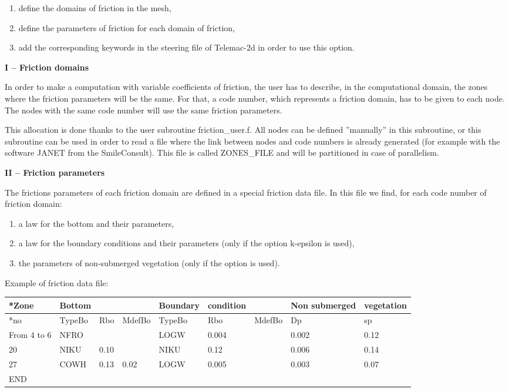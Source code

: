 \documentclass{article} %
\begin{document}
\begin{enumerate}
\item  define the domains of friction in the mesh,

\item  define the parameters of friction for each domain of friction,

\item  add the corresponding keywords in the steering file of Telemac-2d in order to use this option.
\end{enumerate}

 \textbf{I -- Friction domains}

 In order to make a computation with variable coefficients of friction, the user has to describe, in the computational domain, the zones where the friction parameters will be the same. For that, a code number, which represents a friction domain, has to be given to each node. The nodes with the same code number will use the same friction parameters.

 This allocation is done thanks to the user subroutine friction\_user.f. All nodes can be defined ''manually'' in this subroutine, or this subroutine can be used in order to read a file where the link between nodes and code numbers is already generated (for example with the software JANET from the SmileConsult). This file is called ZONES\_FILE and will be partitioned in case of parallelism.

 \textbf{II -- Friction parameters}

 The frictions parameters of each friction domain are defined in a special friction data file. In this file we find, for each code number of friction domain:

\begin{enumerate}
\item  a law for the bottom and their parameters,

\item  a law for the boundary conditions and their parameters (only if the option k-epsilon is used),

\item  the parameters of non-submerged vegetation (only if the option is used).
\end{enumerate}

  Example of friction data file:



\begin{tabular}{|p{0.3in}|p{0.3in}|p{0.3in}|p{0.4in}|p{0.4in}|p{0.5in}|p{0.5in}|p{0.7in}|p{0.5in}|} \hline
*Zone & Bottom &  &  & Boundary & condition &  & Non submerged & vegetation \\ \hline
*no & TypeBo & Rbo & MdefBo & TypeBo & Rbo & MdefBo & Dp & sp \\ \hline
From 4 to 6 & NFRO &  &  & LOGW & 0.004 &  & 0.002 & 0.12 \\ \hline
20 & NIKU & 0.10 &  & NIKU & 0.12 &  & 0.006 & 0.14 \\ \hline
27 & COWH & 0.13 & 0.02 & LOGW & 0.005 &  & 0.003 & 0.07 \\ \hline
END &  &  &  &  &  &  &  &  \\ \hline
\end{tabular}
\end{document}
